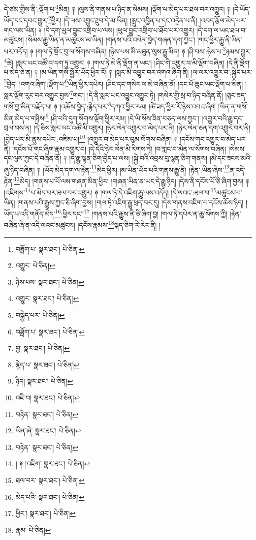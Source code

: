 དེ་ཙམ་གྱིས་ནི་:ལྡོག་པ་\footnote{བཟློག་པ་  སྣར་ཐང་།  པེ་ཅིན། }མིན། ༈ །ལུས་ནི་གནས་པ་ཉིད་ན་སེམས། །ལྡོག་པ་མེད་པར་ཐལ་བར་འགྱུར། ༈ །དེ་ཡོད་ཡོད་དང་དབང་གྱུར་\footnote{འགྱུར་  པེ་ཅིན། }ཕྱིར། །དེ་ལས་འབྱུང་རྔུབ་དེ་མ་ཡིན། །རླུང་འབྱིན་པ་དང་འདྲེན་པ་ནི། །འབད་རྩོལ་མེད་པར་གང་ལས་ཡིན། ༈ །དེ་དག་ཡུལ་བྱུང་འགྲིབ་པ་ལས། །ཕུལ་བྱུང་འགྲིབ་པ་ཐོབ་པར་འགྱུར། །དེ་དག་ལ་ཡང་ཐལ་བ་མཚུངས། །སེམས་རྒྱུ་ཡིན་ན་མཚུངས་མ་ཡིན། །གནས་པའི་འཕེན་བྱེད་གཞན་དག་ཀྱང་། །གང་ཕྱིར་རྒྱུ་ནི་ཡིན་པར་འདོད། ༈ །གལ་ཏེ་སྡོང་བུ་ལ་སོགས་བཞིན། །ཉེས་པས་མི་མཐུན་ལུས་རྒྱུ་མིན། ༈ །ཤི་བས་:ཉེས་པ་\footnote{ཉེས་པས་  སྣར་ཐང་།  པེ་ཅིན། }ཉམས་གྱུར་\footnote{འགྱུར་  སྣར་ཐང་།  པེ་ཅིན། }ཚེ། །སླར་ཡང་འཚོ་བ་དག་ཏུ་འགྱུར། ༈ །གལ་ཏེ་མེ་ནི་ལྡོག་ན་ཡང་། །ཤིང་གི་འགྱུར་བ་མི་ལྡོག་བཞིན། །དེ་ནི་ལྡོག་པ་མེད་ཅེ་ན། ༈ །མ་ཡིན་གསོ་སྦྱོར་ཡོད་ཕྱིར་རོ། ༈ །སླར་མི་འབྱུང་བར་འགའ་ཞིག་ནི། །ལ་ལར་འགྱུར་བ་:སྐྱེད་པར་\footnote{བསྐྱེད་པར་  པེ་ཅིན། }བྱེད། །འགའ་ཞིག་:ལྡོག་པ་\footnote{བཟློག་པ་  སྣར་ཐང་།  པེ་ཅིན། }ཡིན་ཕྱིར་དཔེར། །ཤིང་དང་གསེར་ལ་མེ་བཞིན་ནོ། །དང་པོ་ཆུང་ཡང་ལྡོག་པ་མིན། །སླར་ལྡོག་རུང་བར་འགྱུར་བྱས་\footnote{བྱ་  སྣར་ཐང་།  པེ་ཅིན། }གང་། །དེ་ནི་སླར་ཡང་འབྱུང་འགྱུར་ཏེ། །གསེར་གྱི་སྲ་བ་ཉིད་བཞིན་ནོ། །ཅུང་ཟད་གསོ་བྱ་མིན་བརྗོད་པ། ༈ །འཆོས་བྱེད་:རྙེད་པར་\footnote{རྙེད་པ་  སྣར་ཐང་།  པེ་ཅིན། }དཀའ་ཕྱིར་རམ། །ཚེ་ཟད་ཕྱིར་རོ་ཉེས་འབའ་ཞིག །ཡིན་ན་གསོ་མིན་མེད་པ་གཉིས།\footnote{ཉིད།  སྣར་ཐང་།  པེ་ཅིན། } །ཤི་བའི་དུག་སོགས་ལྡོག་ཕྱིར་རམ། །དེ་ཡི་སོས་ཟིན་བཅད་ལས་ཀྱང་། །འགྱུར་བའི་རྒྱུ་དང་བྲལ་བས་ན། །དེ་ཅིས་སླར་ཡང་འཚོ་མི་འགྱུར། །ཉེར་ལེན་འགྱུར་བ་མེད་པར་ནི། །ཉེར་ལེན་ཅན་དག་འགྱུར་བར་ནི། །བྱེད་པར་མི་ནུས་དཔེར་:འཇིམ་པ།\footnote{འཇི་བ།  སྣར་ཐང་།  པེ་ཅིན། } །འགྱུར་བ་མེད་པར་བུམ་སོགས་བཞིན། ༈ །དངོས་གང་འགྱུར་བ་མེད་པར་ནི། །དངོས་པོ་གང་ཞིག་རྣམ་འགྱུར་བ། །དེ་དེའི་ཉེར་ལེན་མི་རིགས་ཏེ། །བ་གླང་བ་མེན་ལ་སོགས་བཞིན། །སེམས་དང་ལུས་ཀྱང་དེ་བཞིན་ནོ། ༈ །དེ་རྒྱུ་ལྷན་ཅིག་བྱེད་པ་ལས། །སྐྱེ་བའི་འབྲས་བུ་ལྷན་ཅིག་གནས། །མེ་དང་ཟངས་མའི་ཞུ་ཉིད་བཞིན། ༈ །ཡོད་མེད་དག་ལ་རྟེན་\footnote{བརྟེན་  སྣར་ཐང་།  པེ་ཅིན། }མེད་ཕྱིར། །མ་ཡིན་ཡོད་པའི་གནས་རྒྱུ་ནི། །རྟེན་:ཡིན་ཞེས་\footnote{ཡིན་ཞེ་  སྣར་ཐང་།  པེ་ཅིན། }ན་འདི་རྟེན་\footnote{བརྟེན་  སྣར་ཐང་།  པེ་ཅིན། }མེད། །གནས་པ་པོ་ལས་གཞན་མིན་ཕྱིར། །གཞན་ཡིན་ན་ཡང་དེ་རྒྱུ་ཉིད། །དེས་ནི་དངོས་པོ་ཅི་ཞིག་བྱས། ༈ །འཇིགས་\footnote{། ༈ །འཇིག་  སྣར་ཐང་།  པེ་ཅིན། }པ་མེད་པར་ཐལ་བར་འགྱུར། ༈ །གལ་ཏེ་དེ་འཇིག་རྒྱུ་ལས་འདོད། །དེ་ལའང་:ཐལ་བ་\footnote{ཐལ་བར་  སྣར་ཐང་།  པེ་ཅིན། }མཚུངས་པ་ཡིན། །གནས་པའི་རྒྱུས་ཀྱང་ཅི་ཞིག་བྱས། །གལ་ཏེ་འཇིག་རྒྱུ་ཕྲད་བར་དུ། །དེས་གནས་འཇིག་པ་དངོས་ཆོས་ཉིད། །ཡོད་པ་འདི་གནོད་མེད་\footnote{མེད་པའི་  སྣར་ཐང་།  པེ་ཅིན། }:ཕྱིར་དང་།\footnote{ཕྱིར་།  སྣར་ཐང་།  པེ་ཅིན། } །གནས་པའི་རྒྱུས་ནི་ཅི་ཞིག་བྱ། །གལ་ཏེ་དཔེར་ན་ཆུ་སོགས་ཀྱི། །རྟེན་བཞིན་ཞེ་ན་འདི་ལའང་མཚུངས། །དངོས་རྣམས་\footnote{རྣམ་  པེ་ཅིན། }སྐད་ཅིག་རེ་རེར་ནི། །
